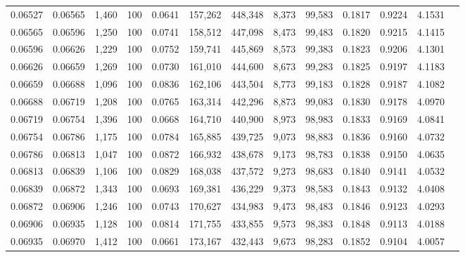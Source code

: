\begin{tabular}{rrrrrrrrrrrrr}
0.06527 & 0.06565 & 1,460 & 100 &                                     0.0641 & 157,262 & 448,348 &   8,373 &  99,583 & 0.1817 & 0.9224 & 4.1531 \\
0.06565 & 0.06596 & 1,250 & 100 &                                     0.0741 & 158,512 & 447,098 &   8,473 &  99,483 & 0.1820 & 0.9215 & 4.1415 \\
0.06596 & 0.06626 & 1,229 & 100 &                                     0.0752 & 159,741 & 445,869 &   8,573 &  99,383 & 0.1823 & 0.9206 & 4.1301 \\
0.06626 & 0.06659 & 1,269 & 100 &                                     0.0730 & 161,010 & 444,600 &   8,673 &  99,283 & 0.1825 & 0.9197 & 4.1183 \\
0.06659 & 0.06688 & 1,096 & 100 &                                     0.0836 & 162,106 & 443,504 &   8,773 &  99,183 & 0.1828 & 0.9187 & 4.1082 \\
0.06688 & 0.06719 & 1,208 & 100 &                                     0.0765 & 163,314 & 442,296 &   8,873 &  99,083 & 0.1830 & 0.9178 & 4.0970 \\
0.06719 & 0.06754 & 1,396 & 100 &                                     0.0668 & 164,710 & 440,900 &   8,973 &  98,983 & 0.1833 & 0.9169 & 4.0841 \\
0.06754 & 0.06786 & 1,175 & 100 &                                     0.0784 & 165,885 & 439,725 &   9,073 &  98,883 & 0.1836 & 0.9160 & 4.0732 \\
0.06786 & 0.06813 & 1,047 & 100 &                                     0.0872 & 166,932 & 438,678 &   9,173 &  98,783 & 0.1838 & 0.9150 & 4.0635 \\
0.06813 & 0.06839 & 1,106 & 100 &                                     0.0829 & 168,038 & 437,572 &   9,273 &  98,683 & 0.1840 & 0.9141 & 4.0532 \\
0.06839 & 0.06872 & 1,343 & 100 &                                     0.0693 & 169,381 & 436,229 &   9,373 &  98,583 & 0.1843 & 0.9132 & 4.0408 \\
0.06872 & 0.06906 & 1,246 & 100 &                                     0.0743 & 170,627 & 434,983 &   9,473 &  98,483 & 0.1846 & 0.9123 & 4.0293 \\
0.06906 & 0.06935 & 1,128 & 100 &                                     0.0814 & 171,755 & 433,855 &   9,573 &  98,383 & 0.1848 & 0.9113 & 4.0188 \\
0.06935 & 0.06970 & 1,412 & 100 &                                     0.0661 & 173,167 & 432,443 &   9,673 &  98,283 & 0.1852 & 0.9104 & 4.0057 \\

\end{tabular}
